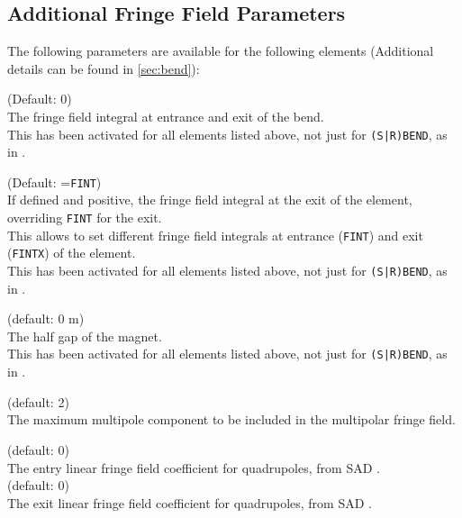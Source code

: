 \subsection{Additional Fringe Field Parameters}

The following parameters are available for the following elements 
(Additional details can be found in \ref{sec:bend}):


\begin{madlist}

   (Default:  0) \\
  The fringe field integral at entrance and exit of the
  bend.\\ This has been activated for all elements listed above, 
  not just for \texttt{(S|R)BEND}, as in \madx. 

   (Default: =\texttt{FINT}) \\
  If defined and positive, the fringe field integral at
  the exit of the element, overriding \texttt{FINT} for the
  exit. \\
  This allows to set different fringe field integrals at entrance
  (\texttt{FINT}) and exit (\texttt{FINTX}) of the element.\\
  This has been activated for all elements listed above, 
  not just for \texttt{(S|R)BEND}, as in \madx. 

   (default: 0 m) \\
  The half gap of the magnet.\\
  This has been activated for all elements listed above, 
  not just for \texttt{(S|R)BEND}, as in \madx. 

   (default: 2) \\
  The maximum multipole component to be included in the multipolar fringe field.

   (default: 0) \\
  The entry linear fringe field coefficient for quadrupoles, from SAD \cite{sad_quad_2022}. \\

   (default: 0) \\
  The exit linear fringe field coefficient for quadrupoles, from SAD \cite{sad_quad_2022}. \\
  

\end{madlist}
